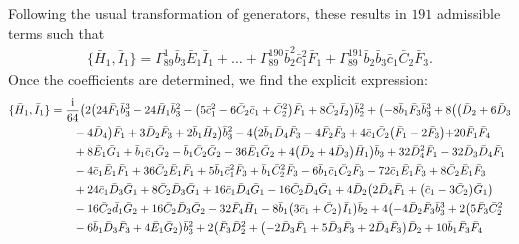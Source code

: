 \documentclass[10pt]{amsart}
\theoremstyle{definition}
\theoremstyle{corollary}
\theoremstyle{remark}
\theoremstyle{conclusion}
\begin{document}
Following the usual transformation of generators,  these results in $191$ admissible  terms such that   
\begin{align*}
    \{\bar{H}_1,\bar{I}_1\} = \Gamma_{89}^1 \bar{b}_3\bar{E}_1\bar{I}_1 +\ldots + \Gamma_{89}^{190}\bar{b}_2^2\bar{c}_1^2 \bar{F}_1 +\Gamma_{89}^{191}\bar{b}_2\bar{b}_3\bar{c}_1\bar{C}_2\bar{F}_3 .
\end{align*} 
 Once the coefficients are determined, we find the explicit expression:
\begin{align}
\{\bar{H}_1, \bar{I}_1\}&=\frac{{\rm i}}{64}  \bigl(2 \bigl(24 \bar{F}_1 \bar{b}_3^3-24 \bar{H}_1 \bar{b}_3^2-\bigl(5 \bar{c}_1^2-6 \bar{C}_2 \bar{c}_1+\bar{C}_2^2\bigl) \bar{F}_1+8 \bar{C}_2 \bar{I}_2\bigl) \bar{b}_2^2+\bigl(-8 \bar{b}_1 \bar{F}_3 \bar{b}_3^3+8 \bigl(\bigl(\bar{D}_2+6 \bar{D}_3\nonumber \\
& \hskip 0.7cm-4 \bar{D}_4\bigl) \bar{F}_1+3 \bar{D}_2 \bar{F}_3+2 \bar{b}_1 \bar{H}_2\bigl) \bar{b}_3^2-4 \bigl(2 \bar{b}_1 \bar{D}_4 \bar{F}_3-4 \bar{F}_2 \bar{F}_3+4 \bar{c}_1 \bar{C}_2 \bigl(\bar{F}_1-2 \bar{F}_3\bigl)+20 \bar{F}_1 \bar{F}_4\nonumber \\
& \hskip 0.7cm+8 \bar{E}_1 \bar{G}_1+\bar{b}_1 \bar{c}_1 \bar{G}_2-\bar{b}_1 \bar{C}_2 \bar{G}_2-36 \bar{E}_1 \bar{G}_2+4 \bigl(\bar{D}_2+4 \bar{D}_3\bigl) \bar{H}_1\bigl) \bar{b}_3+32 \bar{D}_4^2 \bar{F}_1-32 \bar{D}_3 \bar{D}_4 \bar{F}_1\nonumber \\
& \hskip 0.7cm-4 \bar{c}_1 \bar{E}_1 \bar{F}_1+36 \bar{C}_2 \bar{E}_1 \bar{F}_1+5 \bar{b}_1 \bar{c}_1^2 \bar{F}_3+\bar{b}_1 \bar{C}_2^2 \bar{F}_3-6 \bar{b}_1 \bar{c}_1 \bar{C}_2 \bar{F}_3-72 \bar{c}_1 \bar{E}_1 \bar{F}_3+8 \bar{C}_2 \bar{E}_1 \bar{F}_3\nonumber \\
& \hskip 0.7cm+24 \bar{c}_1 \bar{D}_3 \bar{G}_1+8 \bar{C}_2 \bar{D}_3 \bar{G}_1+16 \bar{c}_1 \bar{D}_4 \bar{G}_1-16 \bar{C}_2 \bar{D}_4 \bar{G}_1+4 \bar{D}_2 \bigl(2 \bar{D}_4 \bar{F}_1+\bigl(\bar{c}_1-3 \bar{C}_2\bigl) \bar{G}_1\bigl)\nonumber \\
& \hskip 0.7cm-16 \bar{C}_2 \bar{d}_1 \bar{G}_2+16 \bar{C}_2 \bar{D}_3 \bar{G}_2-32 \bar{F}_4 \bar{H}_1-8 \bar{b}_1 \bigl(3 \bar{c}_1+\bar{C}_2\bigl) \bar{I}_1\bigl) \bar{b}_2+4 \bigl(-4 \bar{D}_2 \bar{F}_3 \bar{b}_3^3+2 \bigl(5 \bar{F}_3 \bar{C}_2^2\nonumber \\
& \hskip 0.7cm-6 \bar{b}_1 \bar{D}_3 \bar{F}_3+4 \bar{E}_1 \bar{G}_2\bigl) \bar{b}_3^2+2 \bigl(\bar{F}_3 \bar{D}_2^2+\bigl(-2 \bar{D}_3 \bar{F}_1+5 \bar{D}_3 \bar{F}_3+2 \bar{D}_4 \bar{F}_3\bigl) \bar{D}_2+10 \bar{b}_1 \bar{F}_3 \bar{F}_4\nonumber \\

\end{align}
\end{document}
